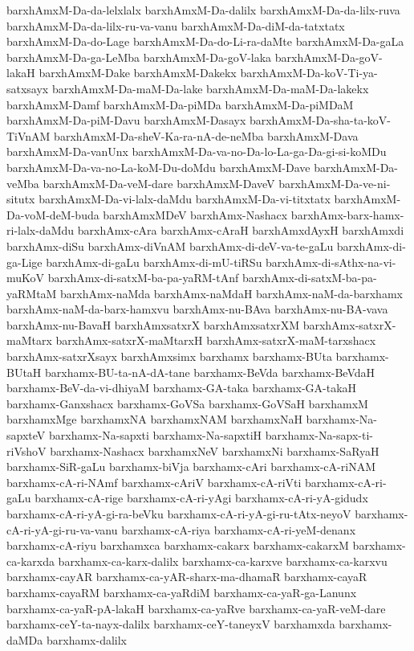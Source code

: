 {barxhAmxM-Da-da-lelxlalx
barxhAmxM-Da-dalilx
barxhAmxM-Da-da-lilx-ruva
barxhAmxM-Da-da-lilx-ru-va-vanu
barxhAmxM-Da-diM-da-tatxtatx
barxhAmxM-Da-do-Lage
barxhAmxM-Da-do-Li-ra-daMte
barxhAmxM-Da-gaLa
barxhAmxM-Da-ga-LeMba
barxhAmxM-Da-goV-laka
barxhAmxM-Da-goV-lakaH
barxhAmxM-Dake
barxhAmxM-Dakekx
barxhAmxM-Da-koV-Ti-ya-satxsayx
barxhAmxM-Da-maM-Da-lake
barxhAmxM-Da-maM-Da-lakekx
barxhAmxM-Damf
barxhAmxM-Da-piMDa
barxhAmxM-Da-piMDaM
barxhAmxM-Da-piM-Davu
barxhAmxM-Dasayx
barxhAmxM-Da-sha-ta-koV-TiVnAM
barxhAmxM-Da-sheV-Ka-ra-nA-de-neMba
barxhAmxM-Dava
barxhAmxM-Da-vanUnx
barxhAmxM-Da-va-no-Da-lo-La-ga-Da-gi-si-koMDu
barxhAmxM-Da-va-no-La-koM-Du-doMdu
barxhAmxM-Dave
barxhAmxM-Da-veMba
barxhAmxM-Da-veM-dare
barxhAmxM-DaveV
barxhAmxM-Da-ve-ni-situtx
barxhAmxM-Da-vi-lalx-daMdu
barxhAmxM-Da-vi-titxtatx
barxhAmxM-Da-voM-deM-buda
barxhAmxMDeV
barxhAmx-Nashacx
barxhAmx-barx-hamx-ri-lalx-daMdu
barxhAmx-cAra
barxhAmx-cAraH
barxhAmxdAyxH
barxhAmxdi
barxhAmx-diSu
barxhAmx-diVnAM
barxhAmx-di-deV-va-te-gaLu
barxhAmx-di-ga-Lige
barxhAmx-di-gaLu
barxhAmx-di-mU-tiRSu
barxhAmx-di-sAthx-na-vi-muKoV
barxhAmx-di-satxM-ba-pa-yaRM-tAnf
barxhAmx-di-satxM-ba-pa-yaRMtaM
barxhAmx-naMda
barxhAmx-naMdaH
barxhAmx-naM-da-barxhamx
barxhAmx-naM-da-barx-hamxvu
barxhAmx-nu-BAva
barxhAmx-nu-BA-vava
barxhAmx-nu-BavaH
barxhAmxsatxrX
barxhAmxsatxrXM
barxhAmx-satxrX-maMtarx
barxhAmx-satxrX-maMtarxH
barxhAmx-satxrX-maM-tarxshacx
barxhAmx-satxrXsayx
barxhAmxsimx
barxhamx
barxhamx-BUta
barxhamx-BUtaH
barxhamx-BU-ta-nA-dA-tane
barxhamx-BeVda
barxhamx-BeVdaH
barxhamx-BeV-da-vi-dhiyaM
barxhamx-GA-taka
barxhamx-GA-takaH
barxhamx-Ganxshacx
barxhamx-GoVSa
barxhamx-GoVSaH
barxhamxM
barxhamxMge
barxhamxNA
barxhamxNAM
barxhamxNaH
barxhamx-Na-sapxteV
barxhamx-Na-sapxti
barxhamx-Na-sapxtiH
barxhamx-Na-sapx-ti-riVshoV
barxhamx-Nashacx
barxhamxNeV
barxhamxNi
barxhamx-SaRyaH
barxhamx-SiR-gaLu
barxhamx-biVja
barxhamx-cAri
barxhamx-cA-riNAM
barxhamx-cA-ri-NAmf
barxhamx-cAriV
barxhamx-cA-riVti
barxhamx-cA-ri-gaLu
barxhamx-cA-rige
barxhamx-cA-ri-yAgi
barxhamx-cA-ri-yA-gidudx
barxhamx-cA-ri-yA-gi-ra-beVku
barxhamx-cA-ri-yA-gi-ru-tAtx-neyoV
barxhamx-cA-ri-yA-gi-ru-va-vanu
barxhamx-cA-riya
barxhamx-cA-ri-yeM-denanx
barxhamx-cA-riyu
barxhamxca
barxhamx-cakarx
barxhamx-cakarxM
barxhamx-ca-karxda
barxhamx-ca-karx-dalilx
barxhamx-ca-karxve
barxhamx-ca-karxvu
barxhamx-cayAR
barxhamx-ca-yAR-sharx-ma-dhamaR
barxhamx-cayaR
barxhamx-cayaRM
barxhamx-ca-yaRdiM
barxhamx-ca-yaR-ga-Lanunx
barxhamx-ca-yaR-pA-lakaH
barxhamx-ca-yaRve
barxhamx-ca-yaR-veM-dare
barxhamx-ceY-ta-nayx-dalilx
barxhamx-ceY-taneyxV
barxhamxda
barxhamx-daMDa
barxhamx-dalilx
}
